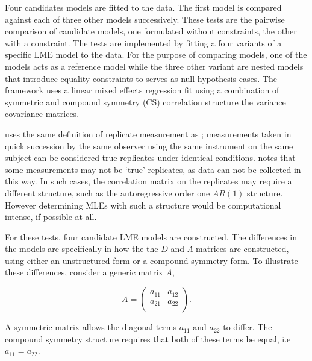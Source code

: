 \documentclass[12pt, a4paper]{report}
\theoremstyle{plain}
\theoremstyle{definition}
\theoremstyle{remark}
\begin{document}
Four candidates models are fitted to the data. The first model is compared against each of three other models successively. These tests are the pairwise comparison of candidate models, one formulated without constraints, the other with a constraint.
 The tests are implemented by fitting a four variants of a specific LME model to the data. For the purpose of comparing models, one of the models acts as a reference model while the three other variant are nested models that introduce equality constraints to serves as null hypothesis cases. The framework uses a linear mixed effects regression fit using a combination of symmetric and compound symmetry (CS) correlation structure the variance covariance matrices.

\citet{ARoy2009} uses the same definition of replicate measurement as \citet{BA99}; measurements taken in quick succession by the same observer using the same instrument on the same subject can be considered true replicates under identical conditions.
 \citet{ARoy2009} notes that some measurements may not be `true' replicates, as data can not be collected in this way. In such cases, the correlation matrix on the replicates may require a different structure, such as the autoregressive order one $AR(1)$ structure. However determining MLEs with such a structure would be computational intense, if possible at all.

For these tests, four candidate LME models are constructed. The differences in the models are specifically in how the the $D$ and $\Lambda$ matrices are constructed, using either an unstructured form or a compound symmetry form. To illustrate these differences, consider a generic matrix $A$,

\[
{A} = \left( \begin{array}{cc}
a_{11} & a_{12}  \\
a_{21} & a_{22}  \\
\end{array}\right).
\]

A symmetric matrix allows the diagonal terms $a_{11}$ and $a_{22}$ to differ. The compound symmetry structure requires that both of these terms be equal, i.e $a_{11} = a_{22}$.
\end{document}
